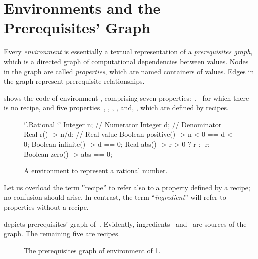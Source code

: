 \section{Environments and the Prerequisites' Graph}

Every \emph{environment} is essentially a textual representation of a
\emph{prerequisites graph}, which is a directed graph of computational
dependencies between values. Nodes in the graph are called \emph{properties},
which are named containers of values. Edges in the graph represent prerequisite
relationships.

 shows the \Reap code of environment ,
comprising seven properties:~,~ for which there is no recipe, and
five properties~, , , , and, ,
which are defined by recipes.

\begin{figure}[H]\caption{\label{figure:rational}%
      A \Reap environment to represent a rational number.
    }
    \begin{adjustbox}{max width=\columnwidth}
\begin{reap}
`'.Rational {`'
  Integer n;       // Numerator
  Integer d;       // Denominator
  Real r() -> n/d; // Real value
  Boolean positive() -> n < 0 == d < 0;
  Boolean infinite() -> d == 0;
  Real abs() -> r > 0 ? r : -r;
  Boolean zero() -> abs == 0;
}
\end{reap}
\end{adjustbox}
\end{figure}

Let us overload the term ‟recipe” to refer also to a property defined by a
recipe; no confusion should arise.  In contrast, the term ``\emph{ingredient}''
will refer to  properties without a recipe.

 depicts prerequisites' graph
of~. Evidently, ingredients~ and~ are sources of the
graph. The remaining five are recipes. 

\begin{figure}[H]
  \caption{\label{figure:rational:prerequisites}%
    The prerequisites graph of \Reap environment  of
    \cref{figure:rational}.
  }
  \begin{adjustbox}{max width=\columnwidth}
      
  \end{adjustbox}
\end{figure}

